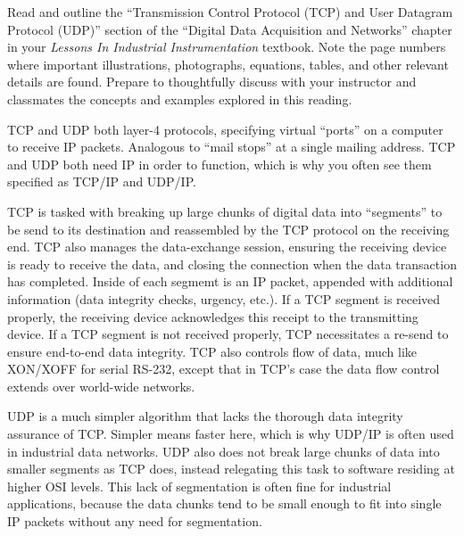 

Read and outline the ``Transmission Control Protocol (TCP) and User Datagram Protocol (UDP)'' section of the ``Digital Data Acquisition and Networks'' chapter in your {\it Lessons In Industrial Instrumentation} textbook.  Note the page numbers where important illustrations, photographs, equations, tables, and other relevant details are found.  Prepare to thoughtfully discuss with your instructor and classmates the concepts and examples explored in this reading.














TCP and UDP both layer-4 protocols, specifying virtual ``ports'' on a computer to receive IP packets.  Analogous to ``mail stops'' at a single mailing address.  TCP and UDP both need IP in order to function, which is why you often see them specified as TCP/IP and UDP/IP.

\vskip 10pt

TCP is tasked with breaking up large chunks of digital data into ``segments'' to be send to its destination and reassembled by the TCP protocol on the receiving end.  TCP also manages the data-exchange session, ensuring the receiving device is ready to receive the data, and closing the connection when the data transaction has completed.  Inside of each segmemt is an IP packet, appended with additional information (data integrity checks, urgency, etc.).  If a TCP segment is received properly, the receiving device acknowledges this receipt to the transmitting device.  If a TCP segment is not received properly, TCP necessitates a re-send to ensure end-to-end data integrity.  TCP also controls flow of data, much like XON/XOFF for serial RS-232, except that in TCP's case the data flow control extends over world-wide networks.

\vskip 10pt

UDP is a much simpler algorithm that lacks the thorough data integrity assurance of TCP.  Simpler means faster here, which is why UDP/IP is often used in industrial data networks.  UDP also does not break large chunks of data into smaller segments as TCP does, instead relegating this task to software residing at higher OSI levels.  This lack of segmentation is often fine for industrial applications, because the data chunks tend to be small enough to fit into single IP packets without any need for segmentation.

